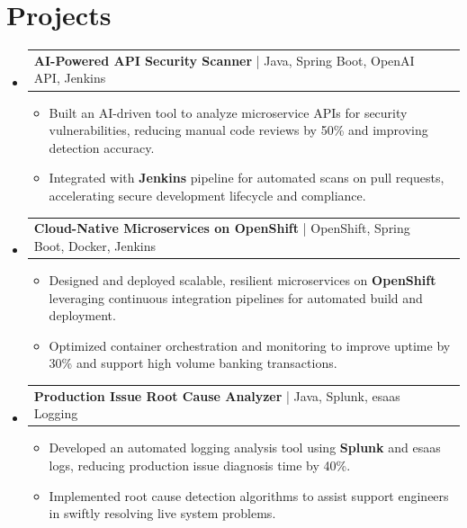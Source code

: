 \documentclass[letterpaper,11pt]{article}
\makeatletter
\newcommand{\resumeItem}[1]{
  \item\footnotesize{
    {#1 \vspace{-2pt}}
  }
}
\newcommand{\resumeProjectHeading}[2]{
    \item
    \begin{tabular*}{1.001\textwidth}{l@{\extracolsep{\fill}}r}
      \small#1 & \textbf{\small #2}\\
    \end{tabular*}\vspace{-7pt}
}
\newcommand{\resumeSubHeadingListStart}{\begin{itemize}[leftmargin=0pt, label={}]}
\newcommand{\resumeSubHeadingListEnd}{\end{itemize}}
\newcommand{\resumeItemListStart}{\begin{itemize}[leftmargin=*]}
\newcommand{\resumeItemListEnd}{\end{itemize}\vspace{-5pt}}
\makeatother
\begin{document}
\section{Projects}
    \vspace{-5pt}
    \resumeSubHeadingListStart
      \resumeProjectHeading
          {\textbf{AI-Powered API Security Scanner} | Java, Spring Boot, OpenAI API, Jenkins}{}
          \resumeItemListStart
              \resumeItem{Built an AI-driven tool to analyze microservice APIs for security vulnerabilities, reducing manual code reviews by 50\% and improving detection accuracy.}
              \resumeItem{Integrated with \textbf{Jenkins} pipeline for automated scans on pull requests, accelerating secure development lifecycle and compliance.}
          \resumeItemListEnd
          \vspace{-12pt}
      \resumeProjectHeading
          {\textbf{Cloud-Native Microservices on OpenShift} | OpenShift, Spring Boot, Docker, Jenkins}{}
          \resumeItemListStart
              \resumeItem{Designed and deployed scalable, resilient microservices on \textbf{OpenShift} leveraging continuous integration pipelines for automated build and deployment.}
              \resumeItem{Optimized container orchestration and monitoring to improve uptime by 30\% and support high volume banking transactions.}
          \resumeItemListEnd
          \vspace{-12pt}
      \resumeProjectHeading
          {\textbf{Production Issue Root Cause Analyzer} | Java, Splunk, esaas Logging}{}
          \resumeItemListStart
              \resumeItem{Developed an automated logging analysis tool using \textbf{Splunk} and esaas logs, reducing production issue diagnosis time by 40\%.}
              \resumeItem{Implemented root cause detection algorithms to assist support engineers in swiftly resolving live system problems.}
          \resumeItemListEnd 
    \resumeSubHeadingListEnd
\end{document}
